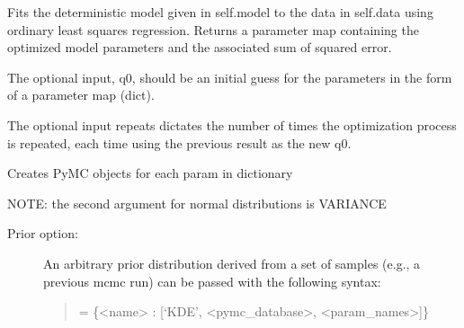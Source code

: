 \documentclass[letterpaper,10pt,english]{sphinxmanual}
\begin{document}
\begin{fulllineitems}
\begin{quote}
\begin{description}
\end{description}\end{quote}

\begin{fulllineitems}
\label{\detokenize{source_code:smcpy.mcmc.mcmc_sampler.MCMCSampler.fit}}
Fits the deterministic model given in self.model to the data in
self.data using ordinary least squares regression. Returns a parameter
map containing the optimized model parameters and the associated sum
of squared error.

The optional input, q0, should be an initial guess for the parameters
in the form of a parameter map (dict).

The optional input repeats dictates the number of times the optimization
process is repeated, each time using the previous result as the new q0.

\end{fulllineitems}


\begin{fulllineitems}
\label{\detokenize{source_code:smcpy.mcmc.mcmc_sampler.MCMCSampler.generate_pymc_}}
Creates PyMC objects for each param in  dictionary

NOTE: the second argument for normal distributions is VARIANCE
\begin{description}
\item[{Prior option:}] \leavevmode
An arbitrary prior distribution derived from a set of samples (e.g.,
a previous mcmc run) can be passed with the following syntax:
\begin{quote}

= \{\textless{}name\textgreater{} : {[}‘KDE’, \textless{}pymc\_database\textgreater{}, \textless{}param\_names\textgreater{}{]}\}
\end{quote}


\end{description}
\end{fulllineitems}
\end{fulllineitems}
\end{document}
